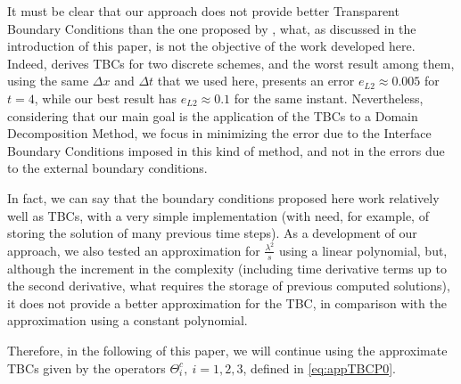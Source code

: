 \indent It must be clear that our approach does not provide better Transparent Boundary Conditions than the one proposed by \cite{besse2015}, what, as discussed in the introduction of this paper, is not the objective of the work developed here. Indeed, \cite{besse2015} derives TBCs for two discrete schemes, and the worst result among them, using the same $\Delta x $ and $\Delta t$ that we used here, presents an error $e_{L2} \approx 0.005$ for $t = 4$, while our best result has $e_{L2} \approx 0.1$ for the same instant. Nevertheless, considering that our main goal is the application of the TBCs to a Domain Decomposition Method, we focus in minimizing the error due to the Interface Boundary Conditions imposed in this kind of method, and not in the errors due to the external boundary conditions.

\indent In fact, we can say that the boundary conditions proposed here work relatively well as TBCs, with a very simple implementation (with need, for example, of storing the solution of many previous time steps). As a development of our approach, we also tested an approximation for $\frac{\lambda^2}{s}$ using a linear polynomial, but, although the increment in the complexity (including time derivative terms up to the second derivative, what requires the storage of previous computed solutions), it does not provide a better approximation for the TBC, in comparison with the approximation using a constant polynomial.

\indent Therefore, in the following of this paper, we will continue using the approximate TBCs given by the operators $\Theta_i^{c}, \ i=1,2,3$, defined in \eqref{eq:appTBCP0}.











